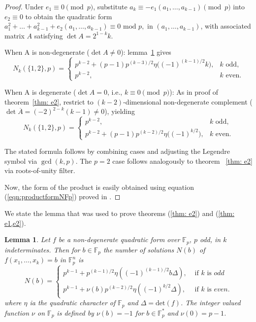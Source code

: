 \documentclass[12pt]{article}
\newtheorem{lem}[thm]{Lemma}%
\begin{document}
\begin{proof}
Under $e_1\equiv0\pmod{p}$, substitute $a_k\equiv -e_1(a_1,\dots,a_{k-1})\pmod{p}$ into $e_2\equiv0$ to obtain the quadratic form $
       a_1^2+\dots+a_{k-1}^2+e_2(a_1,\dots, a_{k-1})\equiv 0\text{ mod }p,$ in $(a_1,\dots,a_{k-1})$, with associated matrix $A$ satisfying $\det A=2^{1-k}k$.

When A is non-degenerate ($\det A\neq0$): lemma~\ref{lem: zeros of quadratic forms} gives
\[
N_k(\{1,2\},p)=\begin{cases}
p^{k-2}+(p-1)p^{(k-3)/2}\eta\bigl((-1)^{(k-1)/2}k\bigr), &k\text{ odd},\\
p^{k-2}, &k\text{ even}.
\end{cases}
\]

When A is degenerate ($\det A=0$, i.e., $k\equiv0\pmod{p}$): As in proof of theorem~\ref{thm: e2}, restrict to $(k-2)$-dimensional non-degenerate complement ($\det\overline{A}=(-2)^{2-k}(k-1)\neq0$), yielding
\[
N_k(\{1,2\},p)=\begin{cases}
p^{k-2}, &k\text{ odd},\\
p^{k-2}+(p-1)p^{(k-2)/2}\eta\bigl((-1)^{k/2}\bigr), &k\text{ even}.
\end{cases}
\]

The stated formula follows by combining cases and adjusting the Legendre symbol via $\gcd(k,p)$. The $p=2$ case follows analogously to theorem ~\ref{thm: e2} via roots-of-unity filter.

Now, the form of the product is easily obtained using equation (\ref{eqn:productformNFp}) proved in \cite[Theorem 2.1]{csizmazia2025generalizationseulersvarphifunctionrespect}.
\end{proof}
We state the lemma that was used to prove theorems (\ref{thm: e2}) and (\ref{thm: e1,e2}).
\begin{lem}\cite[Theorems 6.26, 6.27]{lidl1997finite}\label{lem: zeros of quadratic forms}
     Let $f$ be a non-degenerate quadratic form over $\mathbb{F}_p$, $p$ odd, in $k$ indeterminates. Then for $b\in \mathbb{F}_p$ the number of solutions $N(b)$ of $f(x_1,\dots, x_k)=b$ in $\mathbb{F}_p^n$ is \[
     N(b)=\begin{cases}
         p^{k-1}+p^{(k-1)/2}\eta((-1)^{(k-1)/2}b\Delta), &\text{ if }k\text{ is }odd\\
         p^{k-1}+\nu(b)p^{(k-2)/2}\eta((-1)^{k/2}\Delta), &\text{ if }k\text{ is }even.
     \end{cases}
     \]
     where $\eta$ ia the quadratic character of $\mathbb{F}_p$ and $\Delta=\text{det}(f)$. The integer valued function $\nu$ on $\mathbb{F}_p$ is defined by $\nu(b)=-1$ for $b\in \mathbb{F}_p^*$ and $\nu(0)=p-1$. 
\end{lem}
\end{document}
